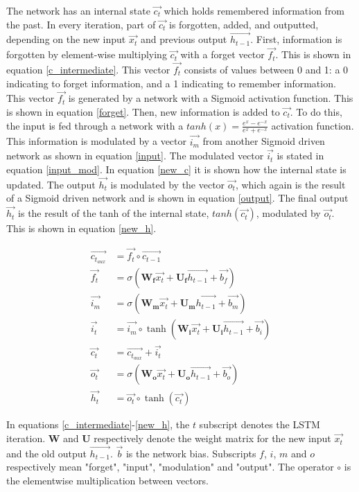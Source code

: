 \documentclass[journal,10pt,twoside, a4paper]{IEEEtran}
\begin{document}
The network has an internal state $\vec{c_t}$ which holds remembered information from the past. In every iteration, part of $\vec{c_t}$ is forgotten, added, and outputted, depending on the new input $\vec{x_t}$ and previous output $\vec{h_{t-1}}$. First, information is forgotten by element-wise multiplying $\vec{c_t}$ with a forget vector $\vec{f_t}$. This is shown in equation \ref{c_intermediate}. This vector $\vec{f_t}$ consists of values between 0 and 1: a 0 indicating to forget information, and a 1 indicating to remember information. This vector $\vec{f_t}$ is generated by a network with a Sigmoid activation function. This is shown in equation \ref{forget}. Then, new information is added to $\vec{c_t}$. To do this, the input is fed through a network with a $tanh(x) = \frac{e^x - e^{-x}}{e^x + e^{-x}}$ activation function. This information is modulated by a vector $\vec{i_m}$ from another Sigmoid driven network as shown in equation \ref{input}. The modulated vector $\vec{i_t}$ is stated in equation \ref{input_mod}. In equation \ref{new_c} it is shown how the internal state is updated. The output $\vec{h_t}$ is modulated by the vector $\vec{o_t}$, which again is the result of a Sigmoid driven network and is shown in equation \ref{output}. The final output $\vec{h_t}$ is the result of the tanh of the internal state, $tanh(\vec{c_t})$, modulated by $\vec{o_t}$. This is shown in equation \ref{new_h}. 

\begin{align}
    \vec{c_{t_{aux}}} &= \vec{f_t} \circ \vec{c_{t-1}} \label{c_intermediate}\\
    \vec{f_t} &= \sigma\left(\mathbf{W_f}\vec{x_t} + \mathbf{U_f}\vec{h_{t-1}}+\vec{b_f}\right) \label{forget}\\
    \vec{i_m} &= \sigma\left(\mathbf{W_m}\vec{x_t} + \mathbf{U_m}\vec{h_{t-1}}+\vec{b_m}\right) \label{input}\\
    \vec{i_t} &= \vec{i_m} \circ \tanh\left(\mathbf{W_i}\vec{x_t} + \mathbf{U_i}\vec{h_{t-1}}+\vec{b_i}\right) \label{input_mod}\\
    \vec{c_t} &= \vec{c_{t_{aux}}} + \vec{i_t} \label{new_c}\\
    \vec{o_t} &= \sigma\left(\mathbf{W_o}\vec{x_t} + \mathbf{U_o}\vec{h_{t-1}}+\vec{b_o}\right) \label{output}\\
    \vec{h_t} &= \vec{o_t} \circ \tanh\left(\vec{c_t}\right) \label{new_h}
\end{align}

In equations \ref{c_intermediate}-\ref{new_h}, the $t$ subscript denotes the LSTM iteration. $\mathbf{W}$ and $\mathbf{U}$ respectively denote the weight matrix for the new input $\vec{x_t}$ and the old output $\vec{h_{t-1}}$. $\vec{b}$ is the network bias. Subscripts $f$, $i$, $m$ and $o$ respectively mean "forget", "input", "modulation" and "output". The operator $\circ$ is the elementwise multiplication between vectors.
\end{document}
